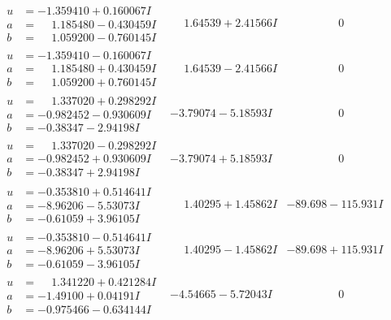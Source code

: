 \documentclass[1p]{elsarticle_modified}
\theoremstyle{definition}
\begin{document}
$$\begin{array}{c|c|c}
\begin{aligned}
u &= -1.359410 + 0.160067 I \\
a &= \phantom{-}1.185480 - 0.430459 I \\
b &= \phantom{-}1.059200 - 0.760145 I\end{aligned}
 & \phantom{-}1.64539 + 2.41566 I & \phantom{-0.000000 } 0 \\ \hline\begin{aligned}
u &= -1.359410 - 0.160067 I \\
a &= \phantom{-}1.185480 + 0.430459 I \\
b &= \phantom{-}1.059200 + 0.760145 I\end{aligned}
 & \phantom{-}1.64539 - 2.41566 I & \phantom{-0.000000 } 0 \\ \hline\begin{aligned}
u &= \phantom{-}1.337020 + 0.298292 I \\
a &= -0.982452 - 0.930609 I \\
b &= -0.38347 - 2.94198 I\end{aligned}
 & -3.79074 - 5.18593 I & \phantom{-0.000000 } 0 \\ \hline\begin{aligned}
u &= \phantom{-}1.337020 - 0.298292 I \\
a &= -0.982452 + 0.930609 I \\
b &= -0.38347 + 2.94198 I\end{aligned}
 & -3.79074 + 5.18593 I & \phantom{-0.000000 } 0 \\ \hline\begin{aligned}
u &= -0.353810 + 0.514641 I \\
a &= -8.96206 - 5.53073 I \\
b &= -0.61059 + 3.96105 I\end{aligned}
 & \phantom{-}1.40295 + 1.45862 I & -89.698 - 115.931 I \\ \hline\begin{aligned}
u &= -0.353810 - 0.514641 I \\
a &= -8.96206 + 5.53073 I \\
b &= -0.61059 - 3.96105 I\end{aligned}
 & \phantom{-}1.40295 - 1.45862 I & -89.698 + 115.931 I \\ \hline\begin{aligned}
u &= \phantom{-}1.341220 + 0.421284 I \\
a &= -1.49100 + 0.04191 I \\
b &= -0.975466 - 0.634144 I\end{aligned}
 & -4.54665 - 5.72043 I & \phantom{-0.000000 } 0 \\ \hline\begin{aligned}

\end{aligned}
\end{array}$$
\end{document}
